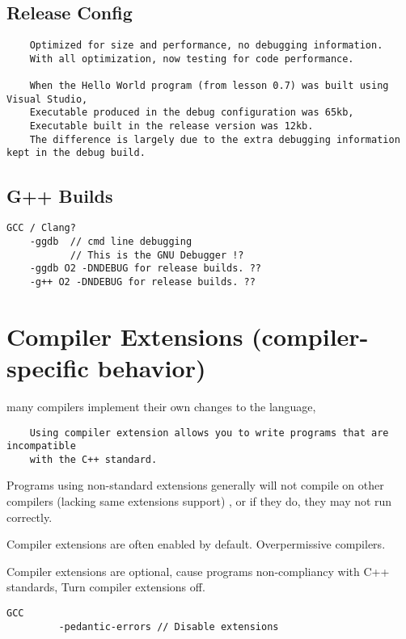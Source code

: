 \documentclass[openany]{report}
\begin{document}
\subsection{Release Config}

\begin{verbatim}
    Optimized for size and performance, no debugging information.
    With all optimization, now testing for code performance.

    When the Hello World program (from lesson 0.7) was built using Visual Studio,
    Executable produced in the debug configuration was 65kb, 
    Executable built in the release version was 12kb. 
    The difference is largely due to the extra debugging information kept in the debug build.
\end{verbatim}

\subsection{G++ Builds}
\begin{verbatim}
GCC / Clang? 
    -ggdb  // cmd line debugging
           // This is the GNU Debugger !?
    -ggdb O2 -DNDEBUG for release builds. ??
    -g++ O2 -DNDEBUG for release builds. ??
\end{verbatim}

\section{Compiler Extensions (compiler-specific behavior)}

    many compilers implement their own changes to the language,
    \begin{verbatim}
    Using compiler extension allows you to write programs that are incompatible
    with the C++ standard.
    \end{verbatim}

    Programs using non-standard extensions generally will not compile on other compilers (lacking same extensions support)
    , or if they do, they may not run correctly.

    Compiler extensions are often enabled by default. Overpermissive compilers.

    Compiler extensions are optional, cause programs non-compliancy with C++ standards,
    Turn compiler extensions off.

\begin{verbatim}
GCC
         -pedantic-errors // Disable extensions
\end{verbatim}
\end{document}
